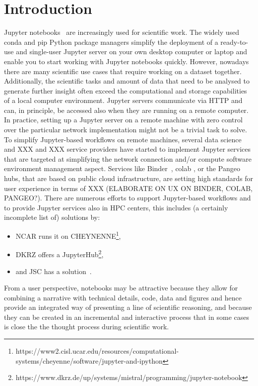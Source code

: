 
\section{Introduction}
\label{s-introductoin}

Jupyter notebooks~\citep{Kluyver2016} are increasingly used for scientific work.
The widely used conda and pip Python package managers simplify the deployment of a ready-to-use and single-user Jupyter server on your own desktop computer or laptop and enable you to start working with Jupyter notebooks quickly.
However, nowadays there are many scientific use cases that require working on a dataset together.
Additionally, the scientific tasks and amount of data that need to be analysed to generate further insight often exceed the computational and storage capabilities of a local computer environment.
Jupyter servers communicate via HTTP and can, in principle, be accessed also when they are running on a remote computer.
In practice, setting up a Jupyter server on a remote machine with zero control over the particular network implementation might not be a trivial task to solve.
To simplify Jupyter-based workflows on remote machines, several data science and XXX and XXX service providers have started to implement Jupyter services that are targeted at simplifying the network connection and/or compute software environment management aspect.
Services like Binder~\citep{Jupyter2018}, colab \citep{Google2020, Carneiro2018}, or the Pangeo hubs\citep{robinson2019science}, that are based on public cloud infrastructure, are setting high standards for user experience in terms of XXX (ELABORATE ON UX ON BINDER, COLAB, PANGEO?).
There are numerous efforts to support Jupyter-based workflows and to provide Jupyter services also in HPC centers, this includes (a certainly incomplete list of) solutions by:

\begin{itemize}
  \item NCAR runs it on CHEYNENNE\footnote{https://www2.cisl.ucar.edu/resources/computational-systems/cheyenne/software/jupyter-and-ipython},
  \item DKRZ offers a JupyterHub\footnote{https://www.dkrz.de/up/systems/mistral/programming/jupyter-notebook},
  \item and JSC has a solution~\citep{Goebbert2018}.
\end{itemize}

From a user perspective, notebooks may be attractive because they allow for combining a narrative with technical details, code, data and figures and hence provide an integrated way of presenting a line of scientific reasoning, and because they can be created in an incremental and interactive process that in some cases is close the the thought process during scientific work.

